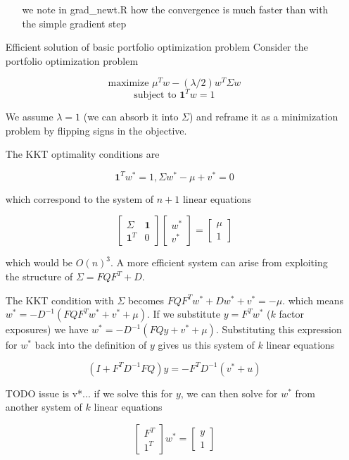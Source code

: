\documentclass[12pt]{article}
\begin{document}
\begin{itemize}
\begin{itemize}
    we note in grad_newt.R how the convergence is much faster than with the simple gradient step
  \end{itemize}

\item[Efficient solution of basic portfolio optimization problem]
  Consider the portfolio optimization problem

  $$\text{maximize    } \mu^T w - (\lambda / 2) w^T \Sigma w$$
  $$\text{subject to  } \textbf{1}^T w = 1$$

  We assume $\lambda = 1$ (we can absorb it into $\Sigma$) and reframe it as a minimization problem by flipping signs in the objective.

  The KKT optimality conditions are

  $$\textbf{1}^T w^* = 1, \Sigma w^* - \mu + v^* = 0$$

  which correspond to the system of $n + 1$ linear equations

  $$\begin{bmatrix}
    \Sigma & \textbf{1} \\
    \textbf{1}^T & 0
  \end{bmatrix} \begin{bmatrix}
    w^* \\
    v^*
    \end{bmatrix} = \begin{bmatrix}
    \mu \\
    1
    \end{bmatrix}$$

    which would be $O(n)^3$. A more efficient system can arise from exploiting the structure of $\Sigma = FQF^T + D$.

    The KKT condition with $\Sigma$ becomes $FQF^T w^* + Dw^* + v^* = -\mu$. which means $w^* = -D^{-1} \left(FQF^Tw^* + v^* + \mu \right)$. If we substitute $y = F^T w^*$ ($k$ factor exposures) we have $w^* = -D^{-1} \left(FQy + v^* + \mu \right)$. Substituting this expression for $w^*$ back into the definition of $y$ gives us this system of $k$ linear equations

    $$\left(I + F^T D^{-1}FQ \right) y = -F^T D^{-1} (v^* + u)$$

    TODO issue is v*...
    if we solve this for $y$, we can then solve for $w^*$ from another system of $k$ linear equations

    $$\begin{bmatrix} F^T \\ 1^T \end{bmatrix} w^* = \begin{bmatrix} y \\ 1 \end{bmatrix}$$


\end{itemize}
\end{document}
